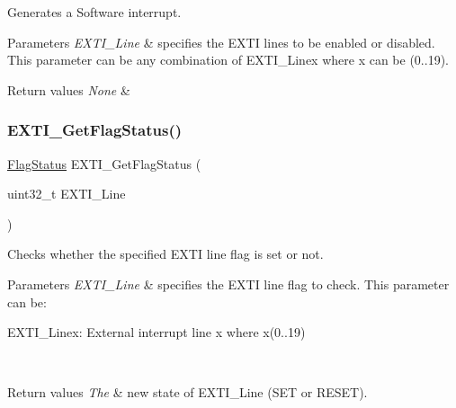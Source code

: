 Generates a Software interrupt. 


\begin{DoxyParams}{Parameters}
{\em E\+X\+T\+I\+\_\+\+Line} & specifies the E\+X\+TI lines to be enabled or disabled. This parameter can be any combination of E\+X\+T\+I\+\_\+\+Linex where x can be (0..19). \\
\hline
\end{DoxyParams}

\begin{DoxyRetVals}{Return values}
{\em None} & \\
\hline
\end{DoxyRetVals}
\mbox{\label{group___e_x_t_i___private___functions_ga0ce06e6b312592df149800d63218cffa}} 
\subsubsection{\texorpdfstring{EXTI\_GetFlagStatus()}{EXTI\_GetFlagStatus()}}
{\footnotesize\ttfamily \mbox{\hyperlink{group___exported__types_ga89136caac2e14c55151f527ac02daaff}{Flag\+Status}} E\+X\+T\+I\+\_\+\+Get\+Flag\+Status (\begin{DoxyParamCaption}\item[{uint32\+\_\+t}]{E\+X\+T\+I\+\_\+\+Line }\end{DoxyParamCaption})}



Checks whether the specified E\+X\+TI line flag is set or not. 


\begin{DoxyParams}{Parameters}
{\em E\+X\+T\+I\+\_\+\+Line} & specifies the E\+X\+TI line flag to check. This parameter can be\+: \begin{DoxyItemize}
\item E\+X\+T\+I\+\_\+\+Linex\+: External interrupt line x where x(0..19) \end{DoxyItemize}
\\
\hline
\end{DoxyParams}

\begin{DoxyRetVals}{Return values}
{\em The} & new state of E\+X\+T\+I\+\_\+\+Line (S\+ET or R\+E\+S\+ET). \\
\hline
\end{DoxyRetVals}
\mbox{\label{group___e_x_t_i___private___functions_gaf7b51519062ae42fd27ee689cab364aa}} 
